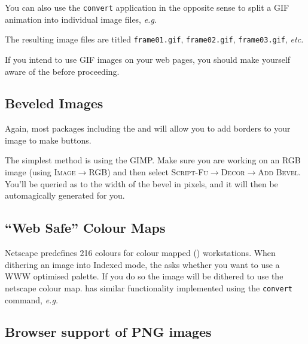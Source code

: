 \documentclass[twoside,11pt]{starlink}
\begin{document}
You can also use the \texttt{convert} application in the opposite sense
to split a GIF animation into individual image files, \emph{e.g.\ }

\begin{terminalv}
\end{terminalv}

The resulting image files are titled \texttt{frame01.gif}, \texttt{frame02.gif}, \texttt{frame03.gif}, \emph{etc.}

If you intend to use GIF images on your web pages, you should make
yourself aware of the  before
proceeding.

\subsection{Beveled Images\label{sc15_bevel}}

Again, most packages including the  and
 will allow you to add borders to
your image to make buttons.

The simplest method is using the GIMP. Make sure you are working on an
RGB image (using \textsc{Image}$\rightarrow${RGB}) and then select \textsc{Script-Fu}$\rightarrow$\textsc{Decor}$\rightarrow$\textsc{Add Bevel}. You'll
be queried as to the width of the bevel in pixels, and it will then be
automagically generated for you.

\subsection{``Web Safe'' Colour Maps\label{sc15_websafe}}

Netscape predefines 216 colours for colour mapped () workstations. When dithering an image into
Indexed mode, the  asks whether you want to
use a WWW optimised palette. If you do so the image will be dithered
to use the netscape colour map.  has
similar functionality implemented using the \texttt{convert} command,
\emph{e.g.\ }

\begin{terminalv}
\end{terminalv}

\subsection{Browser support of PNG images\label{sc15_browser+png}}
\end{document}
